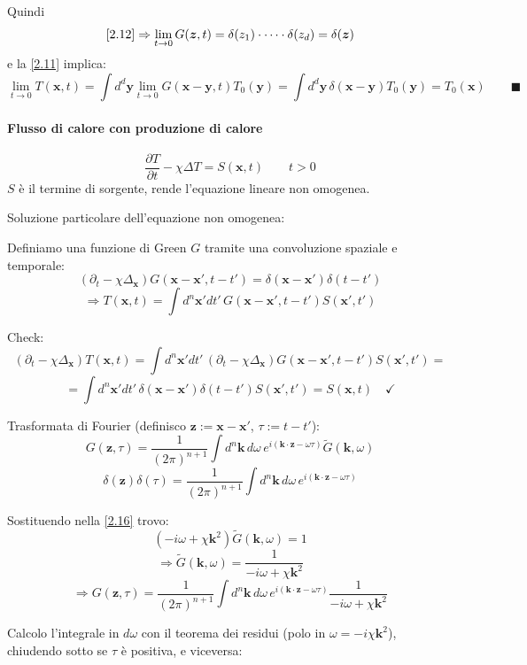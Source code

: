 \documentclass[a4paper,11pt]{report}
\newcommand{\x}{\boldsymbol{x}}
\newcommand{\y}{\boldsymbol{y}}
\newcommand{\kk}{\boldsymbol{k}}
\newcommand{\z}{\boldsymbol{z}}
\begin{document}
Quindi
\[
\eqref{2.12}\Rightarrow\lim_{t\to 0} G(\z,t)=\delta(z_1)\cdot\dots\cdot\delta(z_d)=\delta(\z)
\]
e la \eqref{2.11} implica:
\[
\lim_{t\to 0}T(\x,t)=\int d^d\y \lim_{t\to 0}G(\x-\y,t)T_0(\y)=\int d^d \y\,\delta(\x-\y)T_0(\y)=T_0(\x) \qquad \blacksquare
\]

\paragraph{Flusso di calore con produzione di calore}
\[
\frac{\partial T}{\partial t} -\chi\Delta T=S(\x,t) \qquad t>0
\]
$S$ \`e il termine di sorgente, rende l'equazione lineare non omogenea.

\medskip

Soluzione particolare dell'equazione non omogenea:

Definiamo una funzione di Green $G$ tramite una convoluzione spaziale e temporale:
\begin{equation}
\left(\partial_t-\chi\Delta_{\x}\right)G(\x-\x', t-t')=\delta(\x-\x')\delta(t-t')
\label{2.16}
\end{equation}
\begin{equation}
\Rightarrow T(\x,t)=\int d^n\x'dt'\,G(\x-\x', t-t')S(\x', t')
\label{2.17}
\end{equation}

Check: 
\[
(\partial_t-\chi\Delta_{\x})T(\x,t)=\int d^n\x'dt'\,(\partial_t-\chi\Delta_{\x})G(\x-\x',t-t')S(\x',t')=
\]
\[
=\int d^n\x'dt' \,\delta(\x-\x')\delta(t-t') S(\x',t')=S(\x,t) \quad \checkmark
\]

Trasformata di Fourier (definisco $\z:=\x-\x'$, $\tau := t-t'$):
\[
G(\z,\tau)=\frac{1}{(2\pi)^{n+1}}\int d^n\kk\, d\omega \, e^{i(\kk\cdot \z-\omega\tau)}\tilde{G}(\kk ,\omega)
\]
\[
\delta(\z)\delta(\tau)=\frac{1}{(2\pi)^{n+1}}\int d^n\kk\, d\omega \, e^{i(\kk\cdot \z-\omega\tau)}
\]

Sostituendo nella \eqref{2.16} trovo:
\[
(-i\omega+\chi\kk ^2)\tilde{G}(\kk ,\omega)=1
\]
\[
\Rightarrow\tilde{G}(\kk ,\omega)=\frac{1}{-i\omega+\chi\kk ^2}
\]
\[
\Rightarrow G(\z,\tau)=\frac{1}{(2\pi)^{n+1}}\int d^n\kk\, d\omega \, e^{i(\kk\cdot \z-\omega\tau)}\frac{1}{-i\omega+\chi\kk ^2}
\]

Calcolo l'integrale in $d\omega$ con il teorema dei residui (polo in $\omega=-i\chi \kk^2$), chiudendo sotto se $\tau$ \`e positiva, e viceversa:
\end{document}

